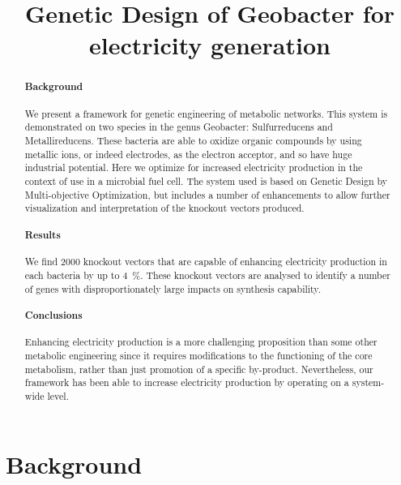\documentclass[a4paper,twocolumn]{article}
\begin{document}
\title{Genetic Design of Geobacter for electricity generation}
\maketitle
\begin{abstract}
\paragraph{Background}
We present a framework for genetic engineering of metabolic networks. This system is demonstrated on two species in the genus Geobacter: Sulfurreducens and Metallireducens. These bacteria are able to oxidize organic compounds by using metallic ions, or indeed electrodes, as the electron acceptor, and so have huge industrial potential. Here we optimize for increased electricity production in the context of use in a microbial fuel cell. The system used is based on Genetic Design by Multi-objective Optimization, but includes a number of enhancements to allow further visualization and interpretation of the knockout vectors produced.
\paragraph{Results}
We find 2000 knockout vectors that are capable of enhancing electricity production in each bacteria by up to \SI{4}{\percent}. These knockout vectors are analysed to identify a number of genes with disproportionately large impacts on synthesis capability.
\paragraph{Conclusions}
Enhancing electricity production is a more challenging proposition than some other metabolic engineering since it requires modifications to the functioning of the core metabolism, rather than just promotion of a specific by-product. Nevertheless, our framework has been able to increase electricity production by operating on a system-wide level.

\end{abstract}

\section{Background}
\end{document}
